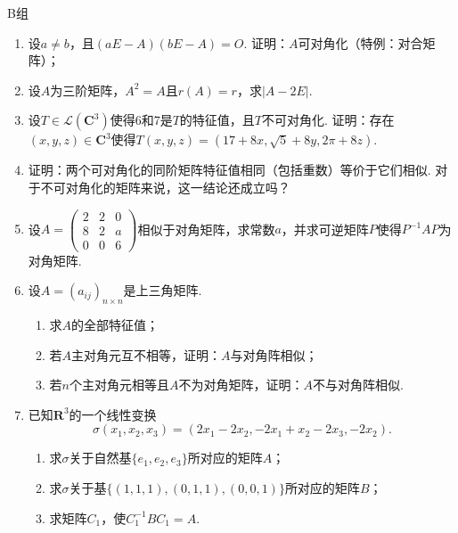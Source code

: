 \centerline{\heiti B组}
\begin{enumerate}
    \item 设$a\neq b$，且$(aE-A)(bE-A)=O$. 证明：$A$可对角化（特例：对合矩阵）；

    \item 设$A$为三阶矩阵，$A^2=A$且$r(A)=r$，求$|A-2E|$.

    \item 设$T\in \mathcal{L}(\mathbf{C}^3)$使得6和7是$T$的特征值，且$T$不可对角化. 证明：存在$(x,y,z)\in\mathbf{C}^3$使得$T(x,y,z)=(17+8x,\sqrt{5}+8y,2\pi+8z)$.

    \item 证明：两个可对角化的同阶矩阵特征值相同（包括重数）等价于它们相似. 对于不可对角化的矩阵来说，这一结论还成立吗？

    \item 设$A=\begin{pmatrix}
                  2 & 2 & 0 \\ 8 & 2 & a \\ 0 & 0 & 6
              \end{pmatrix}$相似于对角矩阵，求常数$a$，并求可逆矩阵$P$使得$P^{-1}AP$为对角矩阵.

    \item 设$A=(a_{ij})_{n\times n}$是上三角矩阵.
          \begin{enumerate}
              \item 求$A$的全部特征值；

              \item 若$A$主对角元互不相等，证明：$A$与对角阵相似；

              \item 若$n$个主对角元相等且$A$不为对角矩阵，证明：$A$不与对角阵相似.
          \end{enumerate}

    \item 已知$\mathbf{R}^3$的一个线性变换
          \[\sigma(x_1,x_2,x_3)=(2x_1-2x_2,-2x_1+x_2-2x_3,-2x_2).\]
          \begin{enumerate}
              \item 求$\sigma$关于自然基$\{e_1,e_2,e_3\}$所对应的矩阵$A$；

              \item 求$\sigma$关于基$\{(1,1,1),(0,1,1),(0,0,1)\}$所对应的矩阵$B$；

              \item 求矩阵$C_1$，使$C_1^{-1}BC_1=A$.
          \end{enumerate}


\end{enumerate}
